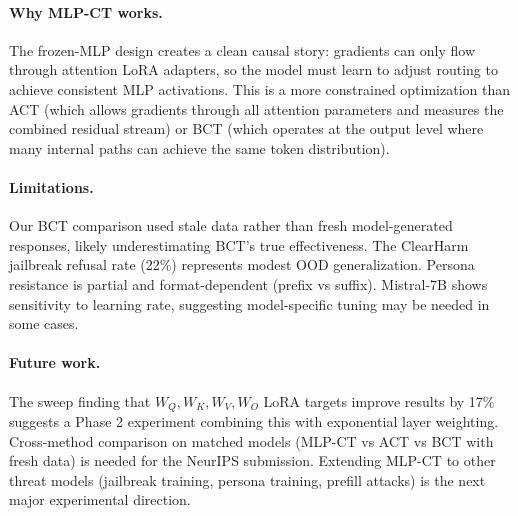 \documentclass[12pt, letterpaper]{article}
\begin{document}
\paragraph{Why MLP-CT works.} The frozen-MLP design creates a clean causal story: gradients can only flow through attention LoRA adapters, so the model must learn to adjust routing to achieve consistent MLP activations. This is a more constrained optimization than ACT (which allows gradients through all attention parameters and measures the combined residual stream) or BCT (which operates at the output level where many internal paths can achieve the same token distribution).

\paragraph{Limitations.} Our BCT comparison used stale data rather than fresh model-generated responses, likely underestimating BCT's true effectiveness. The ClearHarm jailbreak refusal rate (22\%) represents modest OOD generalization. Persona resistance is partial and format-dependent (prefix vs suffix). Mistral-7B shows sensitivity to learning rate, suggesting model-specific tuning may be needed in some cases.

\paragraph{Future work.} The sweep finding that $W_Q, W_K, W_V, W_O$ LoRA targets improve results by 17\% suggests a Phase 2 experiment combining this with exponential layer weighting. Cross-method comparison on matched models (MLP-CT vs ACT vs BCT with fresh data) is needed for the NeurIPS submission. Extending MLP-CT to other threat models (jailbreak training, persona training, prefill attacks) is the next major experimental direction.



\end{document}
